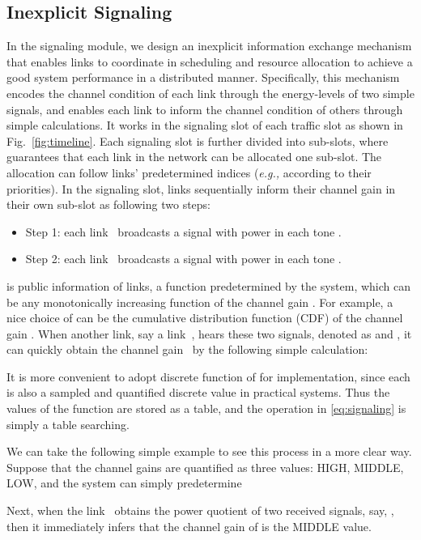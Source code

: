 \documentclass[conference]{IEEEtran}
\newcommand{\eg}{\emph{e.g., }}
\begin{document}
\subsection{Inexplicit Signaling}
\label{sec:signaling}
In the signaling module, we design an inexplicit information exchange mechanism that enables links to coordinate in scheduling and resource allocation to achieve a good system performance in a distributed manner.
Specifically, this mechanism encodes the channel condition of each link through the energy-levels of two simple signals, and enables each link to inform the channel condition of others through simple calculations. It works in the signaling slot of each traffic slot as shown in Fig.~\ref{fig:timeline}. Each signaling slot is further divided into  sub-slots, where  guarantees that each link in the network can be allocated one sub-slot. The allocation can follow links' predetermined indices (\eg according to their priorities).
In the signaling slot, links sequentially inform their channel gain in their own sub-slot as following two steps:
\begin{itemize}
    \item Step 1: each link~ broadcasts a signal with power  in each tone .
	 \item Step 2: each link~ broadcasts a signal with power  in each tone .
\end{itemize}
 is public information of links, a function predetermined by the system, which can be any monotonically increasing function of the channel gain . For example, a nice choice of  can be the cumulative distribution function (CDF) of the channel gain .
When another link, say a link~, hears these two signals, denoted as  and ,  it can quickly obtain the channel gain~ by the following simple calculation:


It is more convenient to adopt discrete function of  for implementation, since each  is also a sampled and quantified discrete value in practical systems. Thus the values of the function  are stored as a table, and the operation in \eqref{eq:signaling} is simply a table searching.

We can take the following simple example to see this process in a more clear way. Suppose that the channel gains are quantified as three values: HIGH, MIDDLE, LOW, and the system can simply predetermine

Next, when the link~ obtains the power quotient of two received signals, say, , then it immediately infers that the channel gain of  is the MIDDLE value.
\end{document}
